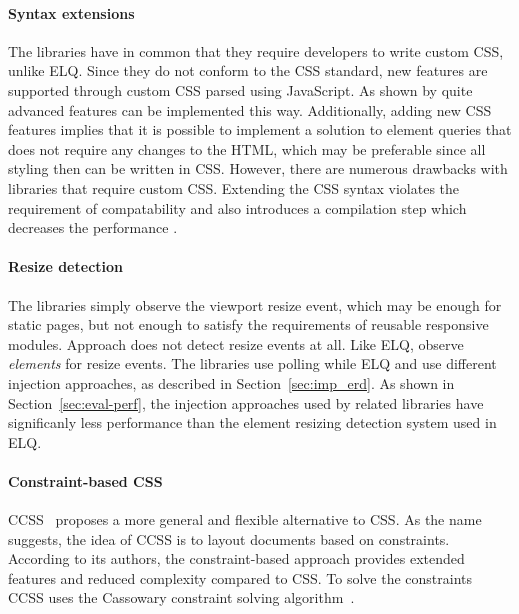 \documentclass{acm_proc_article-sp}
\newcommand{\elq}{ELQ}
\newcommand{\gls}[1]{#1}
\begin{document}
  \paragraph{Syntax extensions}
  The libraries \cite{eq_imp_magichtml,eq_imp_eqcss,eq_imp_prollyfill-min-width,eq_imp_localised-css,eq_imp_gss} have in common that they require developers to write custom \gls{CSS}, unlike \elq{}.
  Since they do not conform to the \gls{CSS} standard, new features are supported through custom \gls{CSS} parsed using JavaScript.
  As shown by \cite{eq_imp_eqcss,eq_imp_gss} quite advanced features can be implemented this way.
  Additionally, adding new \gls{CSS} features implies that it is possible to implement a solution to element queries that does not require any changes to the \gls{HTML}, which may be preferable since all styling then can be written in \gls{CSS}.
  However, there are numerous drawbacks with libraries that require custom \gls{CSS}.
  Extending the CSS syntax violates the requirement of compatability and also introduces a compilation step which decreases the performance \cite{elq-thesis}.

  \paragraph{Resize detection}
  The libraries \cite{eq_imp_eqcss,eq_imp_breakpointsjs,eq_imp_mediaclass,eq_imp_elementquery,eq_imp_responsive-elements,eq_imp_sickles,eq_imp_responsive-elements-2,eq_imp_breaks2000,eq_imp_eqjs} simply observe the \gls{viewport} resize event, which may be enough for static pages, but not enough to satisfy the requirements of reusable responsive modules.
  Approach \cite{eq_imp_classquery} does not detect resize events at all.
  Like \elq{}, \cite{eq_imp_localised-css,eq_imp_selector_queries,eq_imp_prollyfill-min-width,eq_imp_gss,eq_imp_element-queries,eq_imp_css-element-queries} observe \emph{elements} for resize events.
  The libraries \cite{eq_imp_localised-css,eq_imp_selector_queries} use polling while \elq{} and \cite{eq_imp_prollyfill-min-width,eq_imp_gss,eq_imp_element-queries,eq_imp_css-element-queries} use different injection approaches, as described in Section~\ref{sec:imp_erd}.
  As shown in Section~\ref{sec:eval-perf}, the injection approaches used by related libraries have significanly less performance than the element resizing detection system used in \gls{ELQ}.

  \paragraph{Constraint-based CSS}
  CCSS~\cite{badros1999constraint} proposes a more general and flexible alternative to CSS.
  As the name suggests, the idea of \gls{CCSS} is to layout documents based on constraints.
  According to its authors, the constraint-based approach provides extended features and reduced complexity compared to CSS.
  To solve the constraints CCSS uses the Cassowary constraint solving algorithm~\cite{BadrosBS01}.
\end{document}
